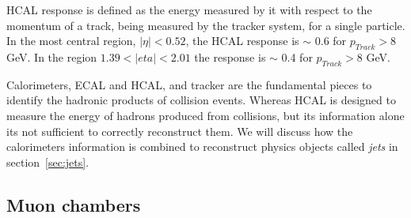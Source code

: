 HCAL response is defined as the energy measured by it with respect to the momentum of a track, being measured by the tracker system, for a single particle. In the most central region, $|\eta|<0.52$, the HCAL response is $\sim$ 0.6 for $p_{Track}>8$ GeV. In the region $1.39<|eta|<2.01$ the response is $\sim$ 0.4 for $p_{Track}>8$ GeV.

%

Calorimeters, ECAL and HCAL, and tracker are the fundamental pieces to identify the hadronic products of collision events. Whereas HCAL is designed to measure the energy of hadrons produced from collisions, but its information alone its not sufficient to correctly reconstruct them. We will discuss how the calorimeters information is combined to reconstruct physics objects called \textit{jets} in section~\ref{sec:jets}.

\subsection{Muon chambers}
\label{sec:muons}

